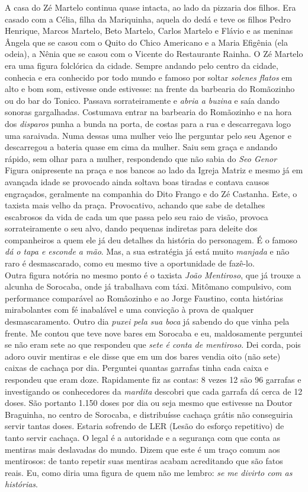 \documentclass[12pt,brazil,]{book}
\begin{document}
A casa do Zé Martelo continua quase intacta, ao lado da pizzaria dos
filhos. Era casado com a Célia, filha da Mariquinha, aquela do dedá e
teve os filhos Pedro Henrique, Marcos Martelo, Beto Martelo, Carlos
Martelo e Flávio e as meninas Ângela que se casou com o Quito do Chico
Americano e a Maria Efigênia (ela odeia), a Nênia que se casou com o
Vicente do Restaurante Rainha. O Zé Martelo era uma figura folclórica da
cidade. Sempre andando pelo centro da cidade, conhecia e era conhecido
por todo mundo e famoso por soltar \emph{solenes flatos} em alto e bom
som, estivesse onde estivesse: na frente da barbearia do Romãozinho ou
do bar do Tonico. Passava sorrateiramente e \emph{abria a buzina} e saía
dando sonoras gargalhadas. Costumava entrar na barbearia do Romãozinho e
na hora dos \emph{disparos} punha a bunda na porta, de costas para a rua
e descarregava logo uma saraivada. Numa dessas uma mulher veio lhe
perguntar pelo seu Agenor e descarregou a bateria quase em cima da
mulher. Saiu sem graça e andando rápido, sem olhar para a mulher,
respondendo que não sabia do \emph{Seo Genor} Figura onipresente na
praça e nos bancos ao lado da Igreja Matriz e mesmo já em avançada idade
se provocado ainda soltava boas tiradas e contava causos engraçados,
geralmente na companhia do Dito Frango e do Zé Castanha. Este, o taxista
mais velho da praça. Provocativo, achando que sabe de detalhes
escabrosos da vida de cada um que passa pelo seu raio de visão, provoca
sorrateiramente o seu alvo, dando pequenas indiretas para deleite dos
companheiros a quem ele já deu detalhes da história do personagem. É o
famoso \emph{dá o tapa e esconde a mão}. Mas, a sua estratégia já está
muito \emph{manjada} e não raro é desmascarado, como eu mesmo tive a
oportunidade de fazê-lo.\\
Outra figura notória no mesmo ponto é o taxista \emph{João Mentiroso},
que já trouxe a alcunha de Sorocaba, onde já trabalhava com táxi.
Mitômano compulsivo, com performance comparável ao Româozinho e ao Jorge
Faustino, conta histórias mirabolantes com fé inabalável e uma convicção
à prova de qualquer desmascaramento. Outro dia \emph{puxei pela sua
boca} já sabendo do que vinha pela frente. Me contou que teve nove bares
em Sorocaba e eu, maldosamente perguntei se não eram sete ao que
respondeu que \emph{sete é conta de mentiroso}. Dei corda, pois adoro
ouvir mentiras e ele disse que em um dos bares vendia oito (não sete)
caixas de cachaça por dia. Perguntei quantas garrafas tinha cada caixa e
respondeu que eram doze. Rapidamente fiz as contas: 8 vezes 12 são 96
garrafas e investigando os conhecedores da \emph{mardita} descobri que
cada garrafa dá cerca de 12 doses. São portanto 1.150 doses por dia ou
seja mesmo que estivesse na Doutor Braguinha, no centro de Sorocaba, e
distribuísse cachaça grátis não conseguiria servir tantas doses. Estaria
sofrendo de LER (Lesão do esforço repetitivo) de tanto servir cachaça. O
legal é a autoridade e a segurança com que conta as mentiras mais
deslavadas do mundo. Dizem que este é um traço comum aos mentirosos: de
tanto repetir suas mentiras acabam acreditando que são fatos reais. Eu,
como diria uma figura de quem não me lembro: \emph{se me divirto com as
histórias}.
\end{document}
